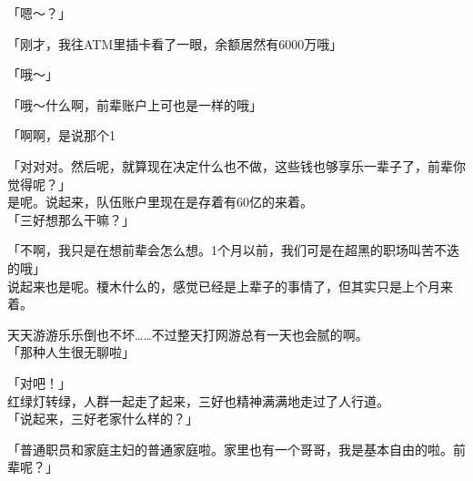 「嗯～？」

「刚才，我往ATM里插卡看了一眼，余额居然有6000万哦」

「哦～」

「哦～什么啊，前辈账户上可也是一样的哦」

「啊啊，是说那个1%

「对对对。然后呢，就算现在决定什么也不做，这些钱也够享乐一辈子了，前辈你觉得呢？」\\

是呢。说起来，队伍账户里现在是存着有60亿的来着。\\

「三好想那么干嘛？」

「不啊，我只是在想前辈会怎么想。1个月以前，我们可是在超黑的职场叫苦不迭的哦」\\

说起来也是呢。榎木什么的，感觉已经是上辈子的事情了，但其实只是上个月来着。

天天游游乐乐倒也不坏……不过整天打网游总有一天也会腻的啊。\\

「那种人生很无聊啦」

「对吧！」\\

红绿灯转绿，人群一起走了起来，三好也精神满满地走过了人行道。\\

「说起来，三好老家什么样的？」

「普通职员和家庭主妇的普通家庭啦。家里也有一个哥哥，我是基本自由的啦。前辈呢？」


